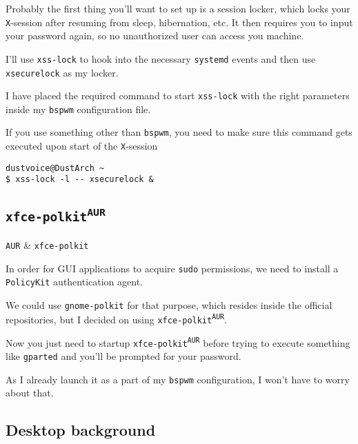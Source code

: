 \documentclass[10pt]{dustdoc}
\begin{document}
Probably the first thing you’ll want to set up is a session locker, which locks your \texttt{X}-session after resuming from sleep, hibernation, etc.
It then requires you to input your password again, so no unauthorized user can access you machine.

I’ll use \texttt{xss-lock} to hook into the necessary \texttt{systemd} events and then use \texttt{xsecurelock} as my locker.

\begin{NOTE}
    I have placed the required command to start \texttt{xss-lock} with the right parameters inside my \texttt{bspwm} configuration file.

    If you use something other than \texttt{bspwm}, you need to make sure this command gets executed upon start of the \texttt{X}-session

    \begin{verbatim}
dustvoice@DustArch ~
$ xss-lock -l -- xsecurelock &
    \end{verbatim}
\end{NOTE}

\subsection{\texttt{xfce-polkit\texorpdfstring{\textsuperscript{AUR}}{ (AUR)}}}
\label{sec:xfce-polkit-aur}

\begin{packagetable}
    \texttt{AUR} & \texttt{xfce-polkit} \\
\end{packagetable}

In order for GUI applications to acquire \texttt{sudo} permissions, we need to install a \texttt{PolicyKit} authentication agent.

We could use \texttt{gnome-polkit} for that purpose, which resides inside the official repositories, but I decided on using \texttt{xfce-polkit\textsuperscript{\texttt{AUR}}}.

Now you just need to startup \texttt{xfce-polkit\textsuperscript{\texttt{AUR}}} before trying to execute something like \texttt{gparted} and you’ll be prompted for your password.

As I already launch it as a part of my \texttt{bspwm} configuration, I won’t have to worry about that.

\subsection{Desktop background}
\label{sec:desktop-background}
\end{document}

